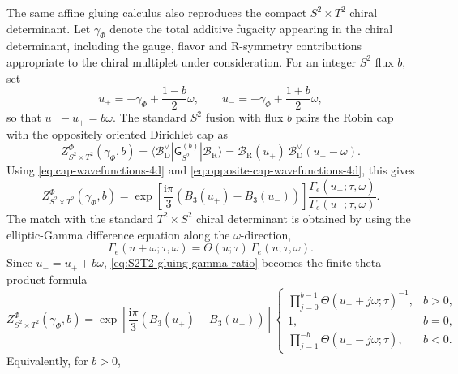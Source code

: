 \documentclass[11pt,a4paper]{article}
\numberwithin{equation}{section}
\theoremstyle{plain}
\theoremstyle{definition}
\theoremstyle{remark}
\newcommand{\ii}{\mathrm{i}}
\begin{document}
The same affine gluing calculus also reproduces the compact \(S^2\times T^2\) chiral determinant.  Let \(\gamma_\Phi\) denote the total additive fugacity appearing in the chiral determinant, including the gauge, flavor and R-symmetry contributions appropriate to the chiral multiplet under consideration.  For an integer \(S^2\) flux \(b\), set
\begin{equation}
u_+
=
-\gamma_\Phi+\frac{1-b}{2}\omega,
\qquad
u_-
=
-\gamma_\Phi+\frac{1+b}{2}\omega,
\label{eq:S2T2-gluing-arguments}
\end{equation}
so that \(u_--u_+=b\omega\).  The standard \(S^2\) fusion with flux \(b\) pairs the Robin cap with the oppositely oriented Dirichlet cap as
\begin{equation}
Z_{S^2\times T^2}^{\Phi}(\gamma_\Phi,b)
=
\langle \mathcal B_{\mathrm D}^{\vee}|
\mathsf G_{S^2}^{(b)}
|\mathcal B_{\mathrm R}\rangle
=
\mathcal B_{\mathrm R}(u_+)\,
\mathcal B_{\mathrm D}^{\vee}(u_- -\omega).
\label{eq:S2T2-gluing-halfblocks}
\end{equation}
Using \eqref{eq:cap-wavefunctions-4d} and \eqref{eq:opposite-cap-wavefunctions-4d}, this gives
\begin{equation}
Z_{S^2\times T^2}^{\Phi}(\gamma_\Phi,b)
=
\exp\!\left[
\frac{\ii\pi}{3}\left(B_3(u_+)-B_3(u_-)\right)
\right]
\frac{\Gamma_e(u_+;\tau,\omega)}
{\Gamma_e(u_-;\tau,\omega)}.
\label{eq:S2T2-gluing-gamma-ratio}
\end{equation}
The match with the standard \(T^2\times S^2\) chiral determinant is obtained by using the elliptic-Gamma difference equation along the \(\omega\)-direction,
\begin{equation}
\Gamma_e(u+\omega;\tau,\omega)
=
\Theta(u;\tau)\,\Gamma_e(u;\tau,\omega).
\label{eq:elliptic-gamma-omega-recursion}
\end{equation}
Since \(u_-=u_++b\omega\), \eqref{eq:S2T2-gluing-gamma-ratio} becomes the finite theta-product formula
\begin{equation}
Z_{S^2\times T^2}^{\Phi}(\gamma_\Phi,b)
=
\exp\!\left[
\frac{\ii\pi}{3}\left(B_3(u_+)-B_3(u_-)\right)
\right]
\begin{cases}
\displaystyle
\prod_{j=0}^{b-1}
\Theta(u_+ + j\omega;\tau)^{-1}, & b>0,\\[3mm]
1, & b=0,\\[2mm]
\displaystyle
\prod_{j=1}^{-b}
\Theta(u_+ - j\omega;\tau), & b<0.
\end{cases}
\label{eq:S2T2-gluing-theta-product}
\end{equation}
Equivalently, for \(b>0\),
\end{document}
